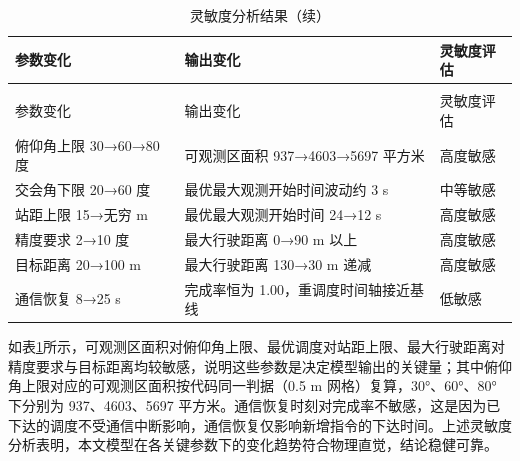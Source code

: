 \begin{longtable}{>{\centering\arraybackslash}p{}>{\centering\arraybackslash}p{}>{\centering\arraybackslash}p{}}
  \caption{灵敏度分析结果}
  \label{tab:sensitivity} \\
  \toprule
  参数变化 & 输出变化 & 灵敏度评估 \\
  \midrule
  \endfirsthead
  \caption{灵敏度分析结果（续）} \\
  \toprule
  参数变化 & 输出变化 & 灵敏度评估 \\
  \midrule
  \endhead
  \bottomrule
  \endfoot
  俯仰角上限 30→60→80 度 & 可观测区面积 937→4603→5697 平方米 & 高度敏感 \\
  交会角下限 20→60 度 & 最优最大观测开始时间波动约 3 s & 中等敏感 \\
  站距上限 15→无穷 m & 最优最大观测开始时间 24→12 s & 高度敏感 \\
  精度要求 2→10 度 & 最大行驶距离 0→90 m 以上 & 高度敏感 \\
  目标距离 20→100 m & 最大行驶距离 130→30 m 递减 & 高度敏感 \\
  通信恢复 8→25 s & 完成率恒为 1.00，重调度时间轴接近基线 & 低敏感 \\
\end{longtable}

如表\ref{tab:sensitivity}所示，可观测区面积对俯仰角上限、最优调度对站距上限、最大行驶距离对精度要求与目标距离均较敏感，说明这些参数是决定模型输出的关键量；其中俯仰角上限对应的可观测区面积按代码同一判据（0.5 m 网格）复算，30°、60°、80° 下分别为 937、4603、5697 平方米。通信恢复时刻对完成率不敏感，这是因为已下达的调度不受通信中断影响，通信恢复仅影响新增指令的下达时间。上述灵敏度分析表明，本文模型在各关键参数下的变化趋势符合物理直觉，结论稳健可靠。
